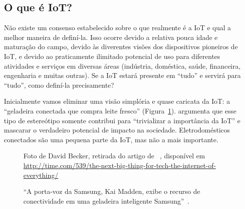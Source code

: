 \documentclass[pdftex, brazil, 12pt, twoside]{article}
\begin{document}
\subsection{O que é IoT?}
\label{conceitos-o-que-e-iot}

Não existe um consenso estabelecido sobre o que realmente é a IoT e qual a melhor
maneira de definí-la. Isso ocorre devido a relativa pouca idade e maturação do
campo, devido às diverentes visões dos dispositivos pioneiros de IoT, e devido
ao praticamente ilimitado potencial de uso para diferentes atividades e serviços
em diversas áreas (indústria, doméstica, saúde, financeira, engenharia e muitas
outras). Se a IoT estará presente em ``tudo'' e servirá para ``tudo'', como
definí-la precisamente?

Inicialmente vamos eliminar uma visão simplória e quase caricata da IoT: a
``geladeira conectada que compra leite fresco'' (Figura~\ref{fig:smart-geladeira}).
\citet{UKGOSWalportIoT2014}
argumenta que esse tipo de estereótipo somente contribui para ``trivializar
a importância da IoT'' e mascarar o verdadeiro potencial de impacto na sociedade.
Eletrodomésticos conectados são uma pequena parte da IoT, mas não a mais
importante.

\begin{figure}[H]
  \begin{center}
    \caption{``A porta-voz da Samsung, Kai Madden, exibe o recurso de conectividade em
      uma geladeira inteligente Samsung''~\citep{BajarinIoE2014}.}
    \label{fig:smart-geladeira}
    \newline
    \footnotesize{Foto de David Becker, retirada do artigo de ~\citet{BajarinIoE2014},
      disponível em \url{http://time.com/539/the-next-big-thing-for-tech-the-internet-of-everything/}}
  \end{center}
\end{figure}
\end{document}
